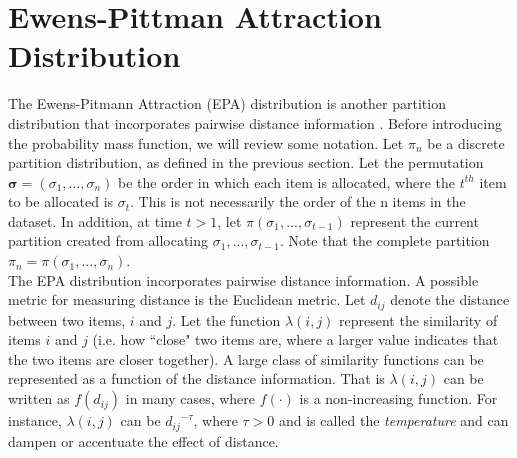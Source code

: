 \section{Ewens-Pittman Attraction Distribution}
The Ewens-Pitmann Attraction (EPA) distribution is another partition
distribution that incorporates pairwise distance information \citep{epa}.
Before introducing the probability mass function, we will review some notation.
Let $\pi_n$ be a discrete partition distribution, as defined in the previous
section. Let the permutation $\bm \sigma = (\sigma_1,...,\sigma_n)$ be the
order in which each item is allocated, where the $t^{th}$ item to be allocated
is $\sigma_t$. This is not necessarily the order of the n items in the dataset.
In addition, at time $t > 1$, let $\pi(\sigma_{1},...,\sigma_{t-1})$ represent
the current partition created from allocating $\sigma_{1},...,\sigma_{t-1}$.
Note that the complete partition $\pi_n = \pi(\sigma_{1},...,\sigma_{n})$.\\

\noindent
The EPA distribution incorporates pairwise distance information. A possible
metric for measuring distance is the Euclidean metric. Let $d_{ij}$ denote the
distance between two items, $i$ and $j$. Let the function $\lambda(i,j)$ represent
the similarity of items $i$ and $j$ (i.e. how ``close" two items are, where a larger
value indicates that the two items are closer together). A large class of similarity
functions can be represented as a function of the distance information. That is
$\lambda(i,j)$ can be written as $f(d_{ij})$ in many cases, where $f(\cdot)$ is a
non-increasing function. For instance, $\lambda(i,j)$ can be ${d_{ij}}^{-\tau}$,
where $\tau>0$ and is called the \textit{temperature} and can dampen or
accentuate the effect of distance.\\

